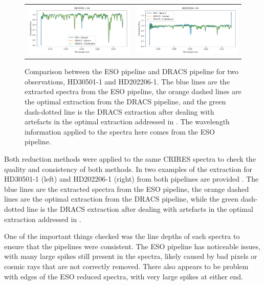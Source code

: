 \begin{figure}
\begin{tabular}{cc}
        \includegraphics[width=0.5\linewidth]{figures/reduction/pipeline_compare/pipeline_compare_HD30501-1_chip_4} & \includegraphics[width=0.5\linewidth]{figures/reduction/pipeline_compare/pipeline_compare_HD202206-1_chip_4}\\
    \end{tabular}
    \caption{Comparison between the {ESO} pipeline and {DRACS} pipeline for two observations, {HD30501-1} and {HD202206-1}. The blue lines are the extracted spectra from the {ESO} pipeline, the orange dashed lines are the optimal extraction from the {DRACS} pipeline, and the green dash-dotted line is the {DRACS} extraction after dealing with artefacts in the optimal extraction addressed in . The wavelength information applied to the spectra here comes from the {ESO} pipeline.}
    \label{fig:reduction-comparison}
\end{figure}

Both reduction methods were applied to the same {CRIRES} spectra to check the quality and consistency of both methods.
In  two examples of the extraction for HD30501-1 (left) and HD202206-1 (right) from both pipelines are provided .
The blue lines are the extracted spectra from the {ESO} pipeline, the orange dashed lines are the optimal extraction from the {DRACS} pipeline, while the green dash-dotted line is the {DRACS} extraction after dealing with artefacts in the optimal extraction addressed in .

One of the important things checked was the line depths of each spectra to ensure that the pipelines were consistent. The {ESO} pipeline has noticeable issues, with many large spikes still present in the spectra, likely caused by bad pixels or cosmic rays that are not correctly removed. There also appears to be problem with edges of the {ESO} reduced spectra, with very large spikes at either end.

